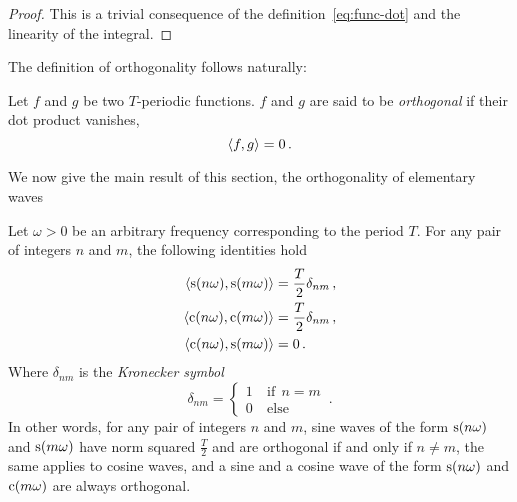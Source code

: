 \begin{proof}
  This is a trivial consequence of the definition~\cref{eq:func-dot} and the linearity of the integral.
\end{proof}
The definition of orthogonality follows naturally:
\begin{definition}
  \label{def:dot-rfunc}
  Let $f$ and $g$ be two $T$-periodic functions. $f$ and $g$ are said to be \emph{orthogonal} if their dot product vanishes, \ie
  \begin{equation}
    \braket{f,g}=0\,.
  \end{equation}
\end{definition}
We now give the main result of this section, \ie the orthogonality of elementary waves
\begin{theorem}
  \label{thm:sc-orth}
  Let $\omega>0$ be an arbitrary frequency corresponding to the period $T$.
  For any pair of integers $n$ and $m$, the following identities hold
  \begin{align}
    \braket{\mathrm{s}(n\omega),\mathrm{s}(m\omega)}&=\frac{T}{2}\delta_{nm}\,,\label{eq:sw-orth}\\
    \braket{\mathrm{c}(n\omega),\mathrm{c}(m\omega)}&=\frac{T}{2}\delta_{nm}\,,\label{eq:cw-orth}\\
    \braket{\mathrm{c}(n\omega),\mathrm{s}(m\omega)}&=0\,.\label{eq:scw-orth}
  \end{align}
  Where $\delta_{nm}$ is the \emph{Kronecker symbol}
  \begin{equation}
    \delta_{nm}=
    \begin{cases}
      1&~\mathrm{if}~~n=m\\
      0&~\mathrm{else}
    \end{cases}\,.
  \end{equation}
  In other words, for any pair of integers $n$ and $m$, sine waves of the form $\mathrm{s}(n\omega)$ and $\mathrm{s}(m\omega)$ have norm squared $\frac{T}{2}$ and are orthogonal if and only if $n\neq m$, the same applies to cosine waves, and a sine and a cosine wave of the form $\mathrm{s}(n\omega)$ and $\mathrm{c}(m\omega)$ are always orthogonal.
\end{theorem}
